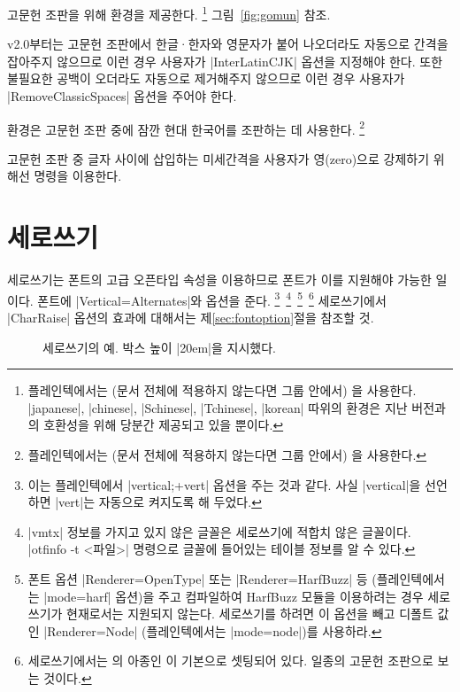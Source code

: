 \documentclass[a4paper]{article}
\def\luatex{\hologo{LuaTeX}}
\def\logoko{\textsf{k}\kern-.0625em\textit{o}}
\def\luatexko{\luatex-\logoko}
\begin{document}
고문헌 조판을 위해  환경을 제공한다.%
\footnote{%
  플레인텍에서는 (문서 전체에 적용하지 않는다면 그룹 안에서)
  을 사용한다.
  |japanese|, |chinese|, |Schinese|, |Tchinese|, |korean| 따위의 환경은
  지난 버전과의 호환성을 위해 당분간 제공되고 있을 뿐이다. }
그림~\ref{fig:gomun} 참조.

v2.0부터는 고문헌 조판에서 한글^^b7한자와 영문자가 붙어 나오더라도 자동으로
간격을 잡아주지 않으므로 이런 경우 사용자가 |InterLatinCJK| 옵션을
지정해야 한다.
또한 불필요한 공백이 오더라도 자동으로 제거해주지 않으므로 이런 경우
사용자가 |RemoveClassicSpaces| 옵션을 주어야 한다.

 환경은 고문헌 조판 중에 잠깐 현대 한국어를 조판하는 데
사용한다.%
\footnote{%
  플레인텍에서는 (문서 전체에 적용하지 않는다면 그룹 안에서)
  을 사용한다. }

고문헌 조판 중  글자 사이에 삽입하는 미세간격을 사용자가
영{\small(zero)}으로 강제하기 위해선 \pkgkwd{\inhibitglue} 명령을 이용한다.

\section{세로쓰기}\label{sec:verttype}

세로쓰기는 폰트의 고급 오픈타입 속성을 이용하므로 폰트가 이를 지원해야
가능한 일이다. 폰트에 |Vertical=Alternates|와 
옵션을 준다.%
\footnote{%
  이는 플레인텍에서 |vertical;+vert| 옵션을 주는 것과 같다.
  사실 |vertical|을 선언하면 |vert|는 자동으로 켜지도록 해 두었다. }\,%
\footnote{%
  |vmtx| 정보를 가지고 있지 않은 글꼴은 세로쓰기에 적합치 않은 글꼴이다.
  |otfinfo -t <파일>| 명령으로 글꼴에 들어있는 테이블 정보를 알 수 있다. }\,%
\footnote{%
  폰트 옵션 |Renderer=OpenType| 또는 |Renderer=HarfBuzz| 등
  (플레인텍에서는 |mode=harf| 옵션)을 주고
  컴파일하여 HarfBuzz 모듈을 이용하려는 경우 세로쓰기가
  현재로서는 지원되지 않는다. 세로쓰기를 하려면 이 옵션을 빼고 디폴트 값인
  |Renderer=Node| (플레인텍에서는 |mode=node|)를 사용하라.}\,%
\footnote{%
  세로쓰기에서는 의 아종인 이
  기본으로 셋팅되어 있다. 일종의 고문헌 조판으로 보는 것이다.
}
세로쓰기에서 |CharRaise| 옵션의 효과에 대해서는 제\ref{sec:fontoption}절을
참조할 것.

\begin{figure}
  \framebox[\linewidth]{
    \begin{vertical}{20em}
      \linespread{1.5}\sffamily \verticalhangulfont
      \hunmintxt
    \end{vertical}
  }
  \caption{세로쓰기의 예. 박스 높이 |20em|을 지시했다.}\label{fig:vertical}
\end{figure}
\end{document}
